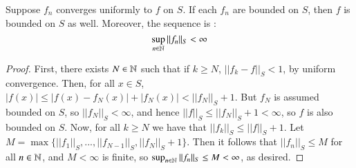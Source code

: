 \begin{lem}
    Suppose $f_n$ converges uniformly to $f$ on $S$. If each $f_n$ are bounded on $S$, then $f$ is bounded on $S$ as well. Moreover, the sequence is : $$\sup_{n \in \mathbb N}||f_n||_S < \infty$$
\end{lem}
\begin{proof}
    First, there exists $N \in \mathbb N$ such that if $k \geq N$, $||f_k - f||_S < 1$, by uniform convergence. Then, for all $x \in S$, $|f(x)| \leq |f(x)-f_N(x)| + |f_N(x)| < ||f_N||_S + 1$. But $f_N$ is assumed bounded on $S$, so $||f_N||_S < \infty$, and hence $||f||_S \leq ||f_N||_S + 1 < \infty$, so $f$ is also bounded on $S$. Now, for all $k \geq N$ we have that $||f_k||_S \leq ||f||_S + 1$. Let $M = \max\{||f_1||_S,...,||f_{N-1}||_S,||f_N||_S + 1\}$. Then it follows that $||f_n||_S \leq M$ for all $n \in \mathbb N$, and $M < \infty$ is finite, so $\sup_{n \in \mathbb N}||f_n||_S \leq M < \infty$, as desired.
\end{proof}


